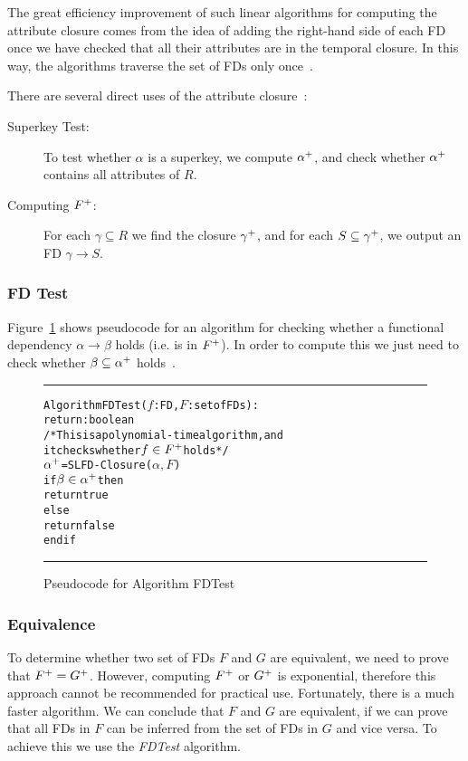 The great efficiency improvement of such linear algorithms for computing the attribute closure
comes from the idea of adding the right-hand side of each FD once we have checked that
all their attributes are in the temporal closure. In
this way, the algorithms traverse the set of FDs
only once~\cite{p10}.

There are several direct uses of the attribute closure~\cite[Section 7.4]{bdb4}:
\begin{description}
    \item[Superkey Test:] To test whether $\alpha$ is a superkey, we compute $\alpha\sp{+}$, and check whether $\alpha\sp{+}$ contains all attributes of $R$.
    \item[Computing $F\sp{+}$:] For each $\gamma \subseteq R$ we find the closure $\gamma\sp{+}$, and for each $S \subseteq \gamma\sp{+}$, we output an FD $\gamma \rightarrow S$.
\end{description}

\subsubsection{FD Test}
Figure~\ref{fig:fdtest} shows pseudocode for an algorithm for checking 
whether a functional dependency $\alpha \rightarrow \beta $ 
holds (i.e. is in $F\sp{+}$). In order to compute this we just need to check 
whether $\beta \subseteq \alpha\sp{+}$ holds~\cite[Section 7.4]{bdb4}.
  
\begin{figure}[htbp]
\hrule
\begin{alltt}

Algorithm FDTest(\(f\): FD, \(F\): set of FDs):
           return: boolean
/* This is a polynomial-time algorithm, and 
it checks whether \(f \in F\sp{+}\) holds */
  \(\alpha\sp{+}\) = SLFD-Closure(\(\alpha, F\))   
  if \(\beta \in \alpha\sp{+}\) then
    return true
  else
    return false
  end if
\end{alltt}
\caption{Pseudocode for Algorithm FDTest}\label{fig:fdtest}
\hrule
\end{figure}

\subsubsection{Equivalence}
To determine whether two set of FDs $F$ and $G$ are equivalent, we need to prove that $F\sp{+} = G\sp{+}$. 
However, computing $F\sp{+}$ or
$G\sp{+}$ is exponential, therefore this approach cannot be recommended for practical use.
Fortunately, there is a much faster algorithm. We can conclude that $F$ and $G$ are
equivalent, if we can prove that all FDs in $F$ can be inferred from the set of FDs in $G$ and vice
versa. To achieve this we use the \textit{FDTest} algorithm.

